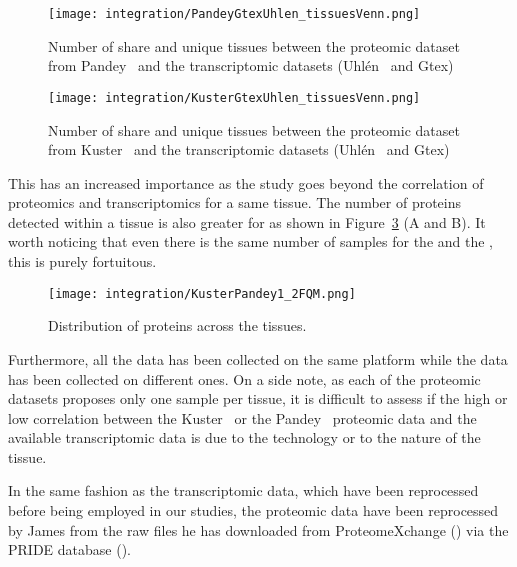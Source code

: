 \begin{figure}%
    \texttt{[image: integration/PandeyGtexUhlen\_tissuesVenn.png]}
    \centering
    \caption{\label{VennTissuePandeyGtexUhlen}Number of share and unique
    tissues between the proteomic dataset from Pandey \etal\ and the
    transcriptomic datasets (Uhlén \etal\ and Gtex)}
\end{figure}

\begin{figure}%
    \texttt{[image: integration/KusterGtexUhlen\_tissuesVenn.png]}
    \centering
    \caption{\label{VennTissueKusterGtexUhlen}Number of share and unique
    tissues between the proteomic dataset from Kuster \etal\ and the
    transcriptomic datasets (Uhlén \etal\ and Gtex)}
\end{figure}

This has an increased importance as the study goes beyond the correlation of
proteomics and transcriptomics for a same tissue. The number of proteins
detected within a tissue is also greater for  as shown
in Figure~\ref{KusterPandeyFQM} (A and B).
It worth noticing that even there is the same number of samples for the
 and the , this is purely fortuitous.

\begin{figure}%
    \texttt{[image: integration/KusterPandey1\_2FQM.png]}\centering
    \caption{\label{KusterPandeyFQM}Distribution of proteins across the tissues.}
\end{figure}

Furthermore, all the  data has been
collected on the same platform while the  data has been
collected on different ones. On a side note, as each of the proteomic datasets
proposes only one sample per tissue, it is difficult to assess if the high or low
correlation between the Kuster \etal\ or the Pandey \etal\ proteomic data
and the available transcriptomic data is due to the technology or
to the nature of the tissue.


In the same fashion as the transcriptomic data, which have been reprocessed
before being employed in our studies, the proteomic data have been reprocessed
by James from the raw files he has downloaded from ProteomeXchange
(\cite{ProteomeXchange:2014}) via the PRIDE database (\cite{Pride:2016}).

